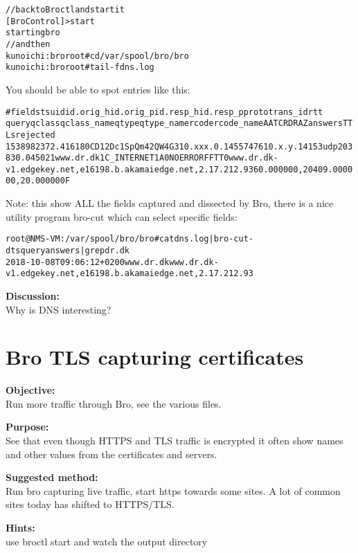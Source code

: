 \documentclass[a4paper,11pt,notitlepage]{report}
\begin{document}
\begin{alltt}\small
// back to Broctl and start it
[BroControl] > start
starting bro
// and then
kunoichi:bro root# cd /var/spool/bro/bro
kunoichi:bro root# tail -f dns.log
\end{alltt}

You should be able to spot entries like this:
\begin{alltt}\small
#fields ts      uid     id.orig_h       id.orig_p       id.resp_h       id.resp_p       proto   trans_id        rtt
     query   qclass  qclass_name     qtype   qtype_name      rcode   rcode_name      AA      TC      RD      RA      Z       answers TTLs    rejected
1538982372.416180	CD12Dc1SpQm42QW4G3	10.xxx.0.145	57476	10.x.y.141	53	udp	20383	0.045021	www.dr.dk	1	C_INTERNET	1	A	0	NOERROR	F	F	T	T	0	www.dr.dk-v1.edgekey.net,e16198.b.akamaiedge.net,2.17.212.93	60.000000,20409.000000,20.000000	F
\end{alltt}

Note: this show ALL the fields captured and dissected by Bro, there is a nice utility program bro-cut which can select specific fields:

\begin{alltt}\small
root@NMS-VM:/var/spool/bro/bro# cat dns.log | bro-cut -d ts query answers | grep dr.dk
2018-10-08T09:06:12+0200	www.dr.dk	www.dr.dk-v1.edgekey.net,e16198.b.akamaiedge.net,2.17.212.93
\end{alltt}

{\bf Discussion:}\\
Why is DNS interesting?


\chapter{Bro TLS capturing certificates}
\label{ex:brotlsbasic}


{\bf Objective:} \\
Run more traffic through Bro, see the various files.


{\bf Purpose:}\\
See that even though HTTPS and TLS traffic is encrypted it often show names and other values from the certificates and servers.


{\bf Suggested method:}\\
Run bro capturing live traffic, start https towards some sites. A lot of common sites today has shifted to HTTPS/TLS.


{\bf Hints:}\\
use broctl start and watch the output directory
\end{document}

